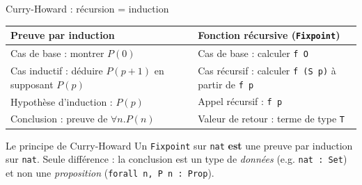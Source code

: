 \documentclass[aspectratio=169]{beamer}
\begin{document}
\begin{frame}{Curry-Howard : récursion = induction}
  \begin{center}
    \begin{tabular}{p{5.5cm}p{5.5cm}}
      \hline
      \textbf{Preuve par induction} & \textbf{Fonction récursive (\texttt{Fixpoint})} \\
      \hline
      Cas de base : montrer $P(0)$ & Cas de base : calculer \texttt{f O} \\[6pt]
      Cas inductif : déduire $P(p + 1)$ en supposant $P(p)$ & Cas récursif : calculer \texttt{f (S p)} à partir de \texttt{f p} \\[6pt]
      Hypothèse d'induction : $P(p)$ & Appel récursif : \texttt{f p} \\[6pt]
      Conclusion : preuve de $\forall n. P(n)$ & Valeur de retour : terme de type \texttt{T} \\
      \hline
    \end{tabular}
  \end{center}
  \pause
  \medskip
  \begin{alertblock}{Le principe de Curry-Howard}
    Un \texttt{Fixpoint} sur \texttt{nat} \textbf{est} une preuve par induction sur \texttt{nat}.
    Seule différence : la conclusion est un type de \emph{données} (e.g. \texttt{nat : Set})
    et non une \emph{proposition} (\texttt{forall n, P n : Prop}).
  \end{alertblock}
\end{frame}
\end{document}
